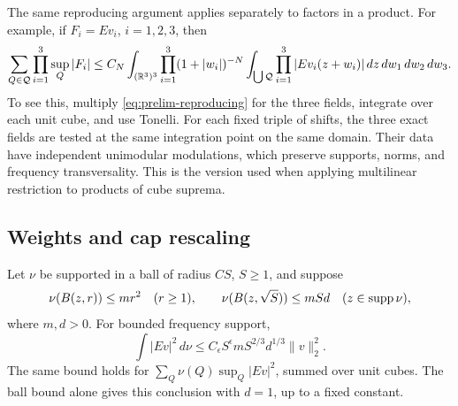 The same reproducing argument applies separately to factors in a product.
For example, if $F_i=Ev_i$, $i=1,2,3$, then
\begin{equation}
 \sum_{Q\in\mathcal Q}\prod_{i=1}^3\sup_Q|F_i|
 \leq C_N\int_{(\mathbb R^3)^3}\prod_{i=1}^3(1+|w_i|)^{-N}
 \int_{\bigcup\mathcal Q}\prod_{i=1}^3|Ev_i(z+w_i)|\,dz
 \,dw_1\,dw_2\,dw_3.
 \label{eq:prelim-product-suprema}
\end{equation}
To see this, multiply \eqref{eq:prelim-reproducing} for the three fields,
integrate over each unit cube, and use Tonelli.  For each fixed triple of
shifts, the three exact fields are tested at the same integration point on
the same domain.  Their data have independent unimodular modulations, which
preserve supports, norms, and frequency transversality.  This is the version
used when applying multilinear restriction to products of cube suprema.

\subsection{Weights and cap rescaling}

\begin{lemma}
\label{lem:prelim-weighted}
Let $\nu$ be supported in a ball of radius $CS$, $S\geq1$, and suppose
\begin{equation}
 \nu(B(z,r))\leq mr^2\quad(r\geq1),\qquad
 \nu(B(z,\sqrt S))\leq mSd
 \quad(z\in\operatorname{supp}\nu),
 \label{eq:prelim-weighted-hypotheses}
\end{equation}
where $m,d>0$.  For bounded frequency support,
\begin{equation}
 \int |Ev|^2\,d\nu
 \leq C_\epsilon S^\epsilon mS^{2/3}d^{1/3}\|v\|_2^2.
 \label{eq:prelim-weighted-fractal}
\end{equation}
The same bound holds for
$\sum_Q\nu(Q)\sup_Q|Ev|^2$, summed over unit cubes.  The ball bound alone
gives this conclusion with $d=1$, up to a fixed constant.
\end{lemma}

